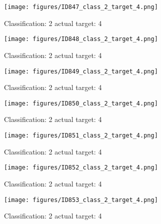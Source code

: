 \begin{figure}[h!]
\begin{center}
\texttt{[image: figures/ID847\_class\_2\_target\_4.png]}
\end{center}
\caption{ Classification: 2 actual target: 4}
\label{fig:ID847_class_2_target_4}
\end{figure}
\begin{figure}[h!]
\begin{center}
\texttt{[image: figures/ID848\_class\_2\_target\_4.png]}
\end{center}
\caption{ Classification: 2 actual target: 4}
\label{fig:ID848_class_2_target_4}
\end{figure}
\begin{figure}[h!]
\begin{center}
\texttt{[image: figures/ID849\_class\_2\_target\_4.png]}
\end{center}
\caption{ Classification: 2 actual target: 4}
\label{fig:ID849_class_2_target_4}
\end{figure}
\begin{figure}[h!]
\begin{center}
\texttt{[image: figures/ID850\_class\_2\_target\_4.png]}
\end{center}
\caption{ Classification: 2 actual target: 4}
\label{fig:ID850_class_2_target_4}
\end{figure}
\begin{figure}[h!]
\begin{center}
\texttt{[image: figures/ID851\_class\_2\_target\_4.png]}
\end{center}
\caption{ Classification: 2 actual target: 4}
\label{fig:ID851_class_2_target_4}
\end{figure}
\begin{figure}[h!]
\begin{center}
\texttt{[image: figures/ID852\_class\_2\_target\_4.png]}
\end{center}
\caption{ Classification: 2 actual target: 4}
\label{fig:ID852_class_2_target_4}
\end{figure}
\begin{figure}[h!]
\begin{center}
\texttt{[image: figures/ID853\_class\_2\_target\_4.png]}
\end{center}
\caption{ Classification: 2 actual target: 4}
\label{fig:ID853_class_2_target_4}
\end{figure}
